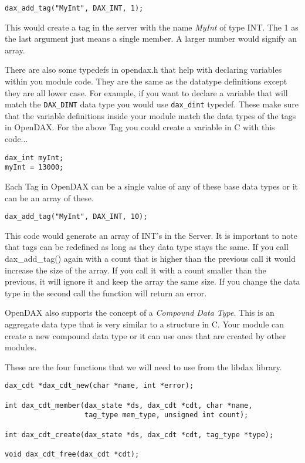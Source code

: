 \begin{verbatim}
dax_add_tag("MyInt", DAX_INT, 1);
\end{verbatim}

This would create a tag in the server with the name \textit{MyInt} of type INT.  The 1 as the last argument just means a single member.  A larger number would signify an array.

There are also some typedefs in opendax.h that help with declaring variables within you module code.  They are the same as the datatype definitions except they are all lower case.  For example, if you want to declare a variable that will match the \verb|DAX_DINT| data type you would use \verb|dax_dint| typedef.  These make sure that the variable definitions inside your module match the data types of the tags in OpenDAX.  For the above Tag you could create a variable in C with this code...

\begin{verbatim}
dax_int myInt;
myInt = 13000;
\end{verbatim}

Each Tag in OpenDAX can be a single value of any of these base data types or it can be an array of these.  

\begin{verbatim}
dax_add_tag("MyInt", DAX_INT, 10);
\end{verbatim}

This code would generate an array of INT's in the Server.  It is important to note that tags can be redefined as long as they data type stays the same.  If you call dax\_add\_tag() again with a count that is higher than the previous call it would increase the size of the array.  If you call it with a count smaller than the previous, it will ignore it and keep the array the same size.  If you change the data type in the second call the function will return an error.

OpenDAX also supports the concept of a \textit{Compound Data Type}.  This is an aggregate data type that is very similar to a structure in C.  Your module can create a new compound data type or it can use ones that are created by other modules.

These are the four functions that we will need to use from the libdax library.

\begin{verbatim}
dax_cdt *dax_cdt_new(char *name, int *error);

int dax_cdt_member(dax_state *ds, dax_cdt *cdt, char *name,
                   tag_type mem_type, unsigned int count);

int dax_cdt_create(dax_state *ds, dax_cdt *cdt, tag_type *type);

void dax_cdt_free(dax_cdt *cdt);
\end{verbatim}

